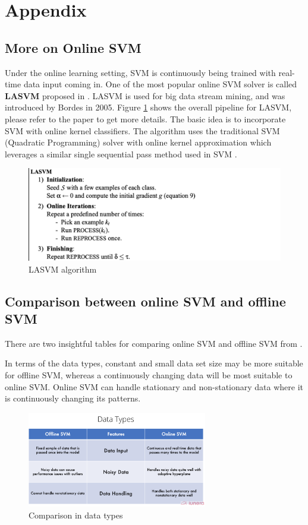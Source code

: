 \documentclass[11pt]{article}
\begin{document}
\section{Appendix}
\subsection{More on Online SVM} 
Under the online learning setting, SVM is continuously being trained with real-time data input coming in. One of the most popular online SVM solver is called \textbf{LASVM} proposed in \cite{lasvm}. LASVM is used for big data stream mining, and was introduced by Bordes in 2005. Figure \ref{fig:lasvm} shows the overall pipeline for LASVM, please refer to the paper to get more details. The basic idea is to incorporate SVM with online kernel classifiers. The algorithm uses the traditional SVM (Quadratic Programming) solver with online kernel approximation which leverages a similar single sequential pass method used in SVM \cite{iunera_2020}.
\begin{figure}[H]
\centering
\includegraphics[width=1.0\textwidth]{LASVM.png}
\caption{LASVM algorithm}
\label{fig:lasvm}
\end{figure}

\subsection{Comparison between online SVM and offline SVM} 
There are two insightful tables for comparing online SVM and offline SVM from \cite{iunera_2020}.

In terms of the data types, constant and small data set size may be more suitable for offline SVM, whereas a continuously changing data will be most suitable to online SVM. Online SVM can handle stationary and non-stationary data where it is continuously changing its patterns.

\begin{figure}[H]
\centering
\includegraphics[width=0.7\textwidth]{com1.png}
\caption{Comparison in data types}
\label{fig:com1}
\end{figure}
\end{document}

